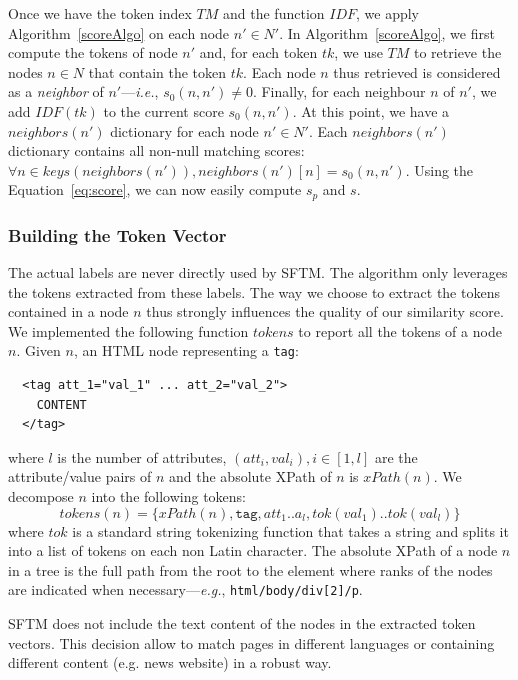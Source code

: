 Once we have the token index $TM$ and the function $IDF$, we apply Algorithm~\ref{scoreAlgo} on each node $n' \in N'$.
In Algorithm~\ref{scoreAlgo}, we first compute the tokens of node $n'$ and, for each token $tk$, we use $TM$ to retrieve the nodes $n \in N$ that contain the token $tk$.
Each node $n$ thus retrieved is considered as a \textit{neighbor} of $n'$---\emph{i.e.}, $s_0(n,n') \neq 0$.
Finally, for each neighbour $n$ of $n'$, we add $IDF(tk)$ to the current score $s_0(n,n')$.
At this point, we have a $neighbors(n')$ dictionary for each node $n' \in N'$.
Each $neighbors(n')$ dictionary contains all non-null matching scores: $\forall n \in keys(neighbors(n')), neighbors(n')[n] = s_0(n,n')$.
Using the Equation~\ref{eq:score}, we can now easily compute $s_{p}$ and $s$.

\subsubsection{Building the Token Vector}\label{tokenSelection}
The actual labels are never directly used by SFTM. The algorithm only leverages the tokens extracted from these labels. The way we choose to extract the tokens contained in a node $n$ thus strongly influences the quality of our similarity score.
We implemented the following function $tokens$ to report all the tokens of a node $n$.
Given $n$, an HTML node representing a \texttt{tag}:
\begin{verbatim}
  <tag att_1="val_1" ... att_2="val_2">
    CONTENT
  </tag> 
\end{verbatim}
where $l$ is the number of attributes, $(att_i, val_i), i \in [1,l]$ are the attribute/value pairs of $n$ and the absolute XPath of $n$ is $xPath(n)$.
We decompose $n$ into the following tokens:
\begin{equation}
	tokens(n) = \{xPath(n), \texttt{tag}, att_1..a_l, tok(val_1)..tok(val_l)\}
\end{equation}
where $tok$ is a standard string tokenizing function that takes a string and splits it into a list of tokens on each non Latin character.
The absolute XPath of a node $n$ in a tree is the full path from the root to the element where ranks of the nodes are indicated when necessary---\emph{e.g.}, \texttt{html/body/div[2]/p}.

SFTM does not include the text content of the nodes in the extracted token vectors.
This decision allow to match pages in different languages or containing different content (e.g. news website) in a robust way.

